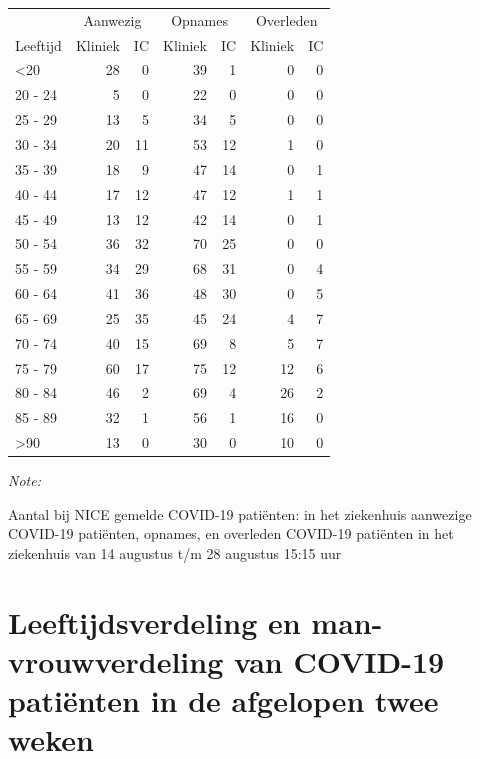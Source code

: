 \documentclass[
  english,
  man,floatsintext]{apa6}
\begin{document}
\begin{table}
\centering\begingroup\fontsize{10}{12}\selectfont

\begin{threeparttable}
\begin{tabular}{lrrrrrr}
\toprule
\multicolumn{1}{c}{ } & \multicolumn{2}{c}{Aanwezig} & \multicolumn{2}{c}{Opnames} & \multicolumn{2}{c}{Overleden} \\
\cmidrule(l{3pt}r{3pt}){2-3} \cmidrule(l{3pt}r{3pt}){4-5} \cmidrule(l{3pt}r{3pt}){6-7}
Leeftijd & Kliniek & IC & Kliniek & IC & Kliniek & IC\\
\midrule
<20 & 28 & 0 & 39 & 1 & 0 & 0\\
20 - 24 & 5 & 0 & 22 & 0 & 0 & 0\\
25 - 29 & 13 & 5 & 34 & 5 & 0 & 0\\
30 - 34 & 20 & 11 & 53 & 12 & 1 & 0\\
35 - 39 & 18 & 9 & 47 & 14 & 0 & 1\\
40 - 44 & 17 & 12 & 47 & 12 & 1 & 1\\
45 - 49 & 13 & 12 & 42 & 14 & 0 & 1\\
50 - 54 & 36 & 32 & 70 & 25 & 0 & 0\\
55 - 59 & 34 & 29 & 68 & 31 & 0 & 4\\
60 - 64 & 41 & 36 & 48 & 30 & 0 & 5\\
65 - 69 & 25 & 35 & 45 & 24 & 4 & 7\\
70 - 74 & 40 & 15 & 69 & 8 & 5 & 7\\
75 - 79 & 60 & 17 & 75 & 12 & 12 & 6\\
80 - 84 & 46 & 2 & 69 & 4 & 26 & 2\\
85 - 89 & 32 & 1 & 56 & 1 & 16 & 0\\
>90 & 13 & 0 & 30 & 0 & 10 & 0\\
\bottomrule
\end{tabular}
\begin{tablenotes}
\item \textit{Note: } 
\item Aantal bij NICE gemelde COVID-19 patiënten: in het ziekenhuis aanwezige COVID-19 patiënten, opnames, en overleden COVID-19 patiënten in het ziekenhuis van 14 augustus t/m 28 augustus 15:15 uur
\end{tablenotes}
\end{threeparttable}
\endgroup{}
\end{table}

\newpage

\hypertarget{leeftijdsverdeling-en-man-vrouwverdeling-van-covid-19-patiuxebnten-in-de-afgelopen-twee-weken}{%
\section{Leeftijdsverdeling en man-vrouwverdeling van COVID-19 patiënten in de afgelopen twee weken}\label{leeftijdsverdeling-en-man-vrouwverdeling-van-covid-19-patiuxebnten-in-de-afgelopen-twee-weken}}
\end{document}
